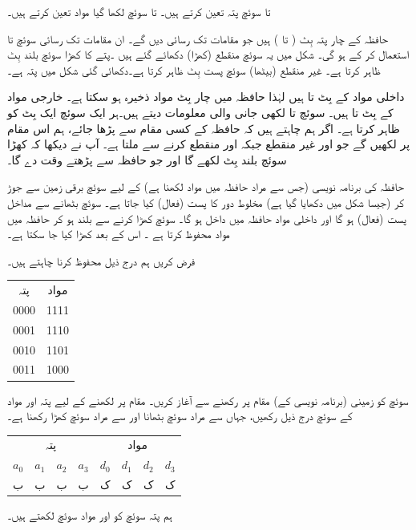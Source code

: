  تا  سوئچ پتہ تعین کرتے ہیں۔  تا  سوئچ لکھا  گیا مواد تعین کرتے ہیں۔

 حافظہ کے چار پتہ بِٹ (  تا  )  ہیں  جو  مقامات تک رسائی  دیں گے۔ ان مقامات تک رسائی  سوئچ  تا  استعمال کر کے ہو گی۔   شکل    میں یہ سوئچ  منقطع    (کھڑا)  دکھائے گئے ہیں ۔پتے     کا  کھڑا سوئچ  بلند  بِٹ  ظاہر کرتا ہے۔  غیر منقطع (بیٹھا) سوئچ پست بِٹ    ظاہر کرتا ہے۔دکھائی گئی شکل میں پتہ  ہے۔
 
 داخلی  مواد کے   بِٹ  تا  ہیں لہٰذا  حافظہ میں چار بِٹ مواد ذخیرہ ہو سکتا ہے۔ خارجی مواد  کے بِٹ  تا  ہیں۔   سوئچ  تا  لکھی   جانی والی معلومات  دیتے ہیں۔ہر ایک سوئچ ایک بِٹ کو ظاہر کرتا ہے۔ اگر ہم  چاہتے ہیں کہ حافظہ کے  کسی مقام سے   پڑھا جائے، ہم اس مقام پر  لکھیں گے جو    اور    غیر منقطع جبکہ  اور   منقطع کرنے سے ملتا ہے۔ آپ نے دیکھا کہ کھڑا سوئچ بلند بِٹ  لکھے گا اور جو  حافظہ سے پڑھتے وقت  دے گا۔

حافظہ کی  برنامہ نویسی   (جس سے مراد حافظہ میں  مواد لکھنا ہے) کے لیے    سوئچ برقی زمین سے جوڑ کر (جیسا شکل میں دکھایا گیا ہے) مخلوط دور کا    پست (فعال)  کیا جاتا ہے۔ سوئچ  بٹھانے   سے  مداخل پست (فعال) ہو  گا اور  داخلی مواد  حافظہ میں داخل ہو گا۔ سوئچ   کھڑا کرنے سے   بلند ہو  کر حافظہ میں مواد  محفوظ  کرتا ہے ۔   اس کے بعد  کھڑا کیا جا سکتا ہے۔

فرض کریں ہم درج ذیل محفوظ کرنا چاہتے ہیں۔
\begin{center}
\begin{tabular}{cc}
پتہ&مواد\\[0.5ex]
0000&1111\\
0001&1110\\
0010&1101\\
0011&1000
\end{tabular}
\end{center}

سوئچ    کو زمینی (برنامہ نویسی کے) مقام  پر رکھنے سے آغاز کریں۔ مقام  پر   لکھنے کے لیے پتہ اور مواد کے سوئچ درج ذیل رکھیں، جہاں   سے مراد سوئچ بٹھانا اور  سے مراد سوئچ کھڑا رکھنا ہے۔
\begin{center}
\begin{tabular}{cccc|cccc}
\multicolumn{4}{c|}{پتہ}&\multicolumn{4}{c}{مواد}\\
$a_0$&$a_1$&$a_2$&$a_3$&$d_0$&$d_1$&$d_2$&$d_3$\\
\toprule
ب&ب&ب&ب&ک&ک&ک&ک
\end{tabular}
\end{center}
ہم پتہ سوئچ کو  اور مواد سوئچ  لکھتے ہیں۔

